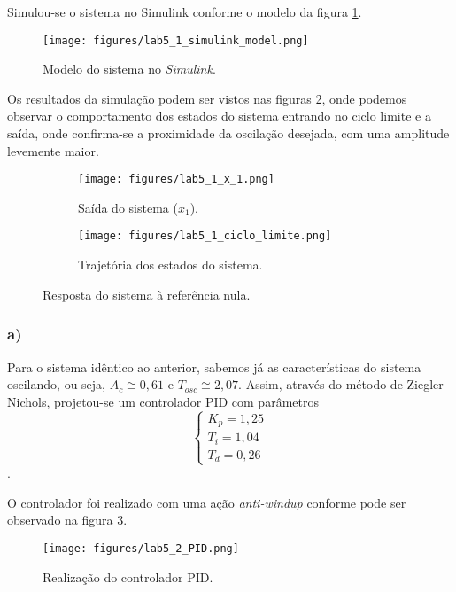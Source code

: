 \documentclass[a4paper]{report}
\begin{document}
Simulou-se o sistema no Simulink conforme o modelo da figura \ref{fig:figures-lab5_1_simulink_model-png}.

\begin{figure}[H]
    \centering
    \texttt{[image: figures/lab5\_1\_simulink\_model.png]}
    \caption{Modelo do sistema no \emph{Simulink}.}
    \label{fig:figures-lab5_1_simulink_model-png}
\end{figure}

Os resultados da simulação podem ser vistos nas figuras \ref{fig:figures-lab4_1_resposta_simulink}, onde podemos observar o comportamento dos estados do sistema entrando no ciclo limite e a saída, onde confirma-se a proximidade da oscilação desejada, com uma amplitude levemente maior.

\begin{figure}[H]
    \centering
    \begin{subfigure}{0.45\textwidth}
	\texttt{[image: figures/lab5\_1\_x\_1.png]}
	\caption{Saída do sistema ($x_1$).}
    \end{subfigure}
    \begin{subfigure}{0.45\textwidth}
	\texttt{[image: figures/lab5\_1\_ciclo\_limite.png]}
	\caption{Trajetória dos estados do sistema.}
    \end{subfigure}
    \caption{Resposta do sistema à referência nula.}
    \label{fig:figures-lab4_1_resposta_simulink}
\end{figure}


\subsubsection*{a)}

Para o sistema idêntico ao anterior, sabemos já as características do sistema oscilando, ou seja, $A_c \cong 0,61$ e $T_{osc}\cong 2,07$. Assim, através do método de Ziegler-Nichols, projetou-se um controlador PID com parâmetros \[
\begin{cases}
    K_p = 1,25 \\
    T_i = 1,04 \\
    T_d = 0,26
\end{cases}
\].

O controlador foi realizado com uma ação \emph{anti-windup} conforme pode ser observado na figura \ref{fig:figures-lab5_2_PID-png}.

\begin{figure}[H]
    \centering
    \texttt{[image: figures/lab5\_2\_PID.png]}
    \caption{Realização do controlador PID.}
    \label{fig:figures-lab5_2_PID-png}
\end{figure}
\end{document}
